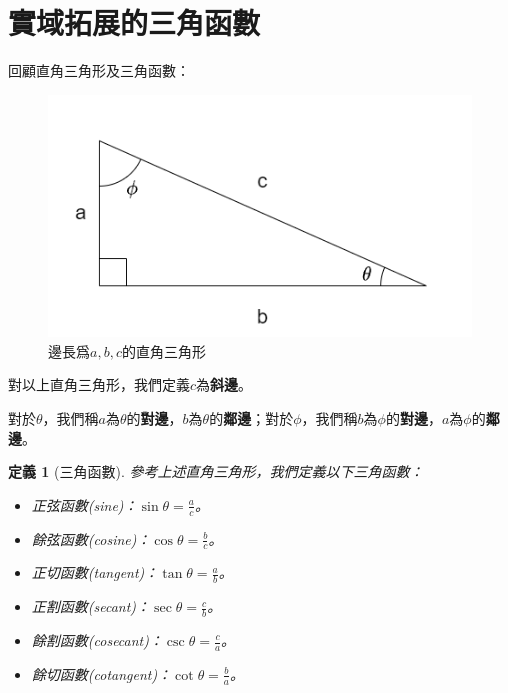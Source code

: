 \documentclass[12pt]{article}
\newtheorem{definition}{定義}
\begin{document}
    \section*{實域拓展的三角函數}

    回顧直角三角形及三角函數：

    \begin{figure}[H]
        \centering
        \includegraphics[scale=0.6]{triangle.png}
        \caption{邊長爲$a,b,c$的直角三角形}
    \end{figure}

    對以上直角三角形，我們定義$c$為\textbf{斜邊}。

    對於$\theta$，我們稱$a$為$\theta$的\textbf{對邊}，$b$為$\theta$的\textbf{鄰邊}；對於$\phi$，我們稱$b$為$\phi$的\textbf{對邊}，$a$為$\phi$的\textbf{鄰邊}。

    \begin{definition}[三角函數]
        參考上述直角三角形，我們定義以下三角函數：\begin{itemize}
            \item 正弦函數(sine)：$\displaystyle\sin{\theta}=\frac{a}{c}$。
            \item 餘弦函數(cosine)：$\displaystyle\cos{\theta}=\frac{b}{c}$。
            \item 正切函數(tangent)：$\displaystyle\tan{\theta}=\frac{a}{b}$。
            \item 正割函數(secant)：$\displaystyle\sec{\theta}=\frac{c}{b}$。
            \item 餘割函數(cosecant)：$\displaystyle\csc{\theta}=\frac{c}{a}$。
            \item 餘切函數(cotangent)：$\displaystyle\cot{\theta}=\frac{b}{a}$。
        \end{itemize}
    \end{definition}
\end{document}
